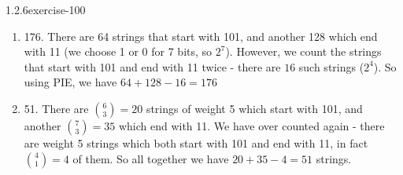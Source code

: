 \documentclass[twoside,11pt,]{book}
\numberwithin{equation}{chapter}
\begin{document}
\begin{divisionsolution}{1.2.6}{}{exercise-100}
\begin{enumerate}[label=(\alph*)]
\({6 \choose 3} = 20\text{.}\) You need to choose 3 of the remaining 6 bits to be 1's.%
\item\hypertarget{li-1160}{}\hypertarget{p-1654}{}%
176. There are 64 strings that start with 101, and another 128 which end with 11 (we choose 1 or 0 for 7 bits, so \(2^7\)). However, we count the strings that start with 101 and end with 11 twice - there are \(16\) such strings (\(2^4\)). So using PIE, we have \(64 + 128 - 16 = 176\)%
\item\hypertarget{li-1161}{}\hypertarget{p-1655}{}%
51. There are \({6 \choose 3} = 20\) strings of weight 5 which start with 101, and another \({7 \choose 3} = 35\) which end with 11. We have over counted again - there are weight 5 strings which both start with 101 and end with 11, in fact \({4 \choose 1} = 4\) of them. So all together we have \(20 + 35 - 4 = 51\) strings.%
\end{enumerate}
%
\end{divisionsolution}%
\end{document}
